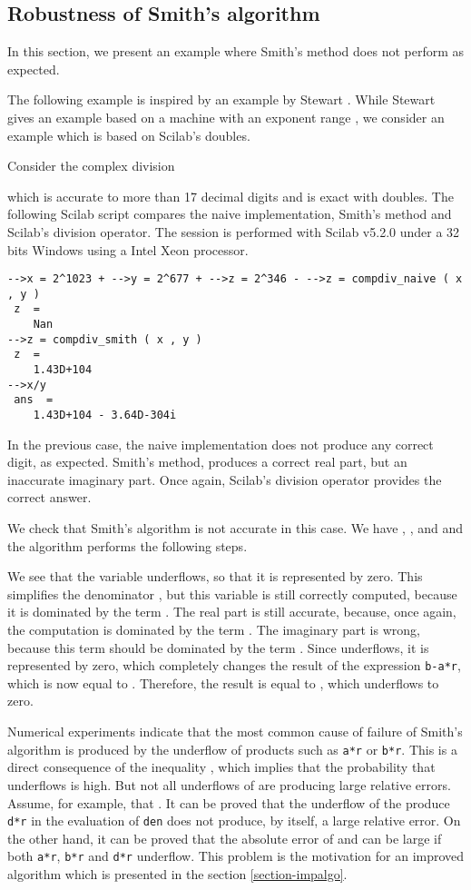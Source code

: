 \documentclass{paper}
\newcommand{\scivar}[1]{\texttt{#1}}
\begin{document}
\subsection{Robustness of Smith's algorithm}
\label{section-smithrobust}

In this section, we present an example where Smith's method does not perform as 
expected.

The following example is inspired by an example by Stewart \cite{214414}. 
While Stewart gives an example based on a machine with an exponent range 
, we consider an example which is based on Scilab's doubles. 

Consider the complex division

which is accurate to more than 17 decimal digits and is exact with 
doubles. 
The following Scilab script compares the naive implementation, Smith's method
and Scilab's division operator.
The session is performed with Scilab v5.2.0 under a 32 bits Windows
using a Intel Xeon processor.
\lstset{language=scilabscript}
\begin{lstlisting}
-->x = 2^1023 + -->y = 2^677 + -->z = 2^346 - -->z = compdiv_naive ( x , y )
 z  =
    Nan 
-->z = compdiv_smith ( x , y )
 z  =
    1.43D+104 
-->x/y
 ans  =
    1.43D+104 - 3.64D-304i
\end{lstlisting}
In the previous case, the naive implementation does not produce any correct digit, as 
expected. 
Smith's method, produces a correct real part, but an inaccurate imaginary 
part. 
Once again, Scilab's division operator provides the correct answer.

We check that Smith's algorithm is not accurate in this case. 
We have , ,  and  and 
the algorithm performs the following steps.

We see that the variable  underflows, so that it is 
represented by zero. 
This simplifies the denominator ,
but this variable is still correctly computed, because it is dominated 
by the term . 
The real part  is still accurate, because,
once again, the computation is dominated by the term .
The imaginary part  is wrong, because this term should be 
dominated by the term . 
Since  underflows, it 
is represented by zero, which completely changes the result of the 
expression \scivar{b-a*r}, which is now equal to .
Therefore, the result is equal to , which 
underflows to zero. 

Numerical experiments indicate that the most common cause of failure 
of Smith's algorithm is produced by the underflow of products such as 
\scivar{a*r} or \scivar{b*r}.
This is a direct consequence of the inequality , which implies 
that  the probability that underflows is high. 
But not all underflows of  are producing large relative errors. 
Assume, for example, that . 
It can be proved \cite{BaudinSmithImpCD2011} that the underflow of the 
produce \scivar{d*r} in the evaluation of \scivar{den} does not produce, 
by itself, a large relative error.
On the other hand, it can be proved that the absolute error of  
and  can be large if both \scivar{a*r}, \scivar{b*r} and 
\scivar{d*r} underflow. 
This problem is the motivation for an improved algorithm which 
is presented in the section \ref{section-impalgo}.
\end{document}
